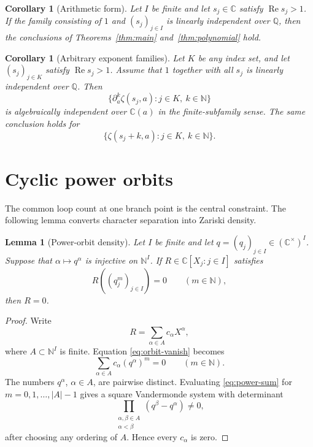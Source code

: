 \documentclass[11pt,reqno]{amsart}
\newtheorem{lemma}[theorem]{Lemma}
\newtheorem{corollary}[theorem]{Corollary}
\theoremstyle{definition}
\theoremstyle{remark}
\newcommand{\C}{\mathbb C}
\newcommand{\Q}{\mathbb Q}
\newcommand{\N}{\mathbb N}
\begin{document}
\begin{corollary}[Arithmetic form]\label{cor:arithmetic}
Let $I$ be finite and let $s_j\in\C$ satisfy
$\operatorname{Re}s_j>1$.  If the family consisting of $1$ and
$(s_j)_{j\in I}$ is linearly independent over $\Q$, then the conclusions of
Theorems~\ref{thm:main} and~\ref{thm:polynomial} hold.
\end{corollary}

\begin{corollary}[Arbitrary exponent families]\label{cor:arbitrary}
Let $K$ be any index set, and let $(s_j)_{j\in K}$ satisfy
$\operatorname{Re}s_j>1$.  Assume that $1$ together with all $s_j$ is
linearly independent over $\Q$.  Then
\[
  \{\partial_a^k\zeta(s_j,a):j\in K,\ k\in\N\}
\]
is algebraically independent over $\C(a)$ in the finite-subfamily sense.
The same conclusion holds for
\[
  \{\zeta(s_j+k,a):j\in K,\ k\in\N\}.
\]
\end{corollary}

\section{Cyclic power orbits}\label{sec:orbits}

The common loop count at one branch point is the central constraint.  The
following lemma converts character separation into Zariski density.

\begin{lemma}[Power-orbit density]\label{lem:power-orbit}
Let $I$ be finite and let $q=(q_j)_{j\in I}\in(\C^\times)^I$.  Suppose that
$\alpha\mapsto q^\alpha$ is injective on $\N^I$.  If
$R\in\C[X_j:j\in I]$ satisfies
\begin{equation}\label{eq:orbit-vanish}
  R((q_j^m)_{j\in I})=0\qquad(m\in\N),
\end{equation}
then $R=0$.
\end{lemma}

\begin{proof}
Write
\[
  R=\sum_{\alpha\in A}c_\alpha X^\alpha,
\]
where $A\subset\N^I$ is finite.  Equation
\eqref{eq:orbit-vanish} becomes
\begin{equation}\label{eq:power-sum}
  \sum_{\alpha\in A}c_\alpha(q^\alpha)^m=0
  \qquad(m\in\N).
\end{equation}
The numbers $q^\alpha$, $\alpha\in A$, are pairwise distinct.  Evaluating
\eqref{eq:power-sum} for $m=0,1,\ldots,|A|-1$ gives a square Vandermonde
system with determinant
\[
  \prod_{\substack{\alpha,\beta\in A\\ \alpha<\beta}}
  (q^\beta-q^\alpha)\neq0,
\]
after choosing any ordering of $A$.  Hence every $c_\alpha$ is zero.
\end{proof}
\end{document}
